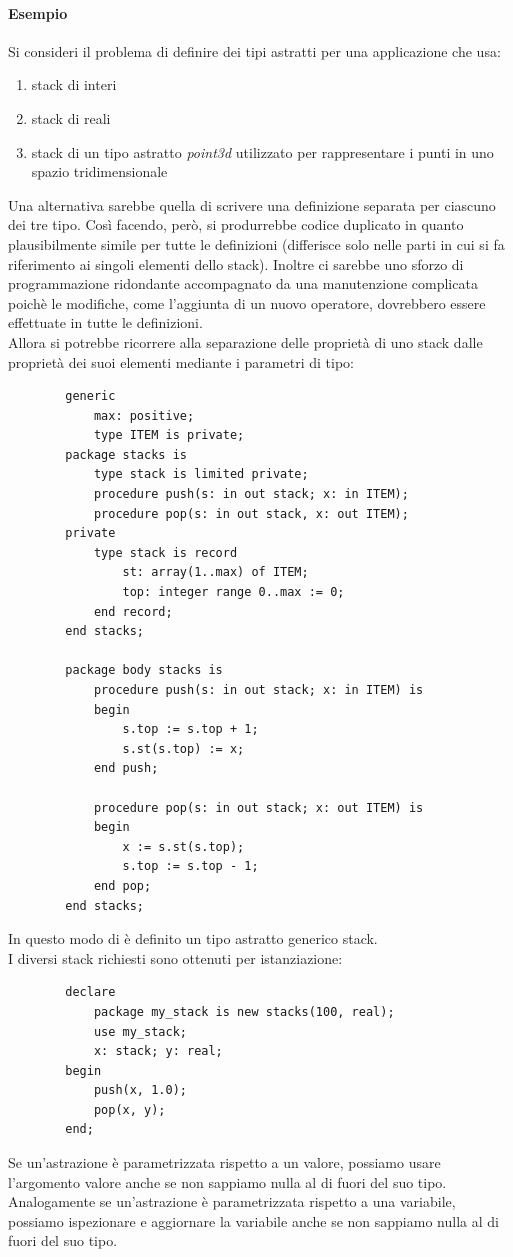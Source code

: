\documentclass{article}
\begin{document}
	\paragraph*{Esempio}
	Si consideri il problema di definire dei tipi astratti per una applicazione che usa:
	\begin{enumerate}
		\item stack di interi
		\item stack di reali
		\item stack di un tipo astratto \textit{point3d} utilizzato per rappresentare i punti in uno spazio tridimensionale
	\end{enumerate}
	Una alternativa sarebbe quella di scrivere una definizione separata per ciascuno dei tre tipo. Così facendo, però, si produrrebbe codice duplicato in quanto plausibilmente simile per tutte le definizioni (differisce solo nelle parti in cui si fa riferimento ai singoli elementi dello stack). Inoltre ci sarebbe uno sforzo di programmazione ridondante accompagnato da una manutenzione complicata poichè le modifiche, come l'aggiunta di un nuovo operatore, dovrebbero essere effettuate in tutte le definizioni. \\
	Allora si potrebbe ricorrere alla separazione delle proprietà di uno stack dalle proprietà dei suoi elementi mediante i parametri di tipo:
	\begin{verbatim}
		generic
			max: positive;
			type ITEM is private;
		package stacks is
			type stack is limited private;
			procedure push(s: in out stack; x: in ITEM);
			procedure pop(s: in out stack, x: out ITEM);
		private
			type stack is record
				st: array(1..max) of ITEM;
				top: integer range 0..max := 0;
			end record;
		end stacks;

		package body stacks is
			procedure push(s: in out stack; x: in ITEM) is
			begin
				s.top := s.top + 1;
				s.st(s.top) := x;
			end push;

			procedure pop(s: in out stack; x: out ITEM) is
			begin
				x := s.st(s.top);
				s.top := s.top - 1;
			end pop;
		end stacks;
	\end{verbatim}
	In questo modo di è definito un tipo astratto generico stack. \\
	I diversi stack richiesti sono ottenuti per istanziazione:
	\begin{verbatim}
		declare
			package my_stack is new stacks(100, real);
			use my_stack;
			x: stack; y: real;
		begin
			push(x, 1.0);
			pop(x, y);
		end;
	\end{verbatim}
	Se un'astrazione è parametrizzata rispetto a un valore, possiamo usare l'argomento valore anche se non sappiamo nulla al di fuori del suo tipo. Analogamente se un'astrazione è parametrizzata rispetto a una variabile, possiamo ispezionare e aggiornare la variabile anche se non sappiamo nulla al di fuori del suo tipo. \\
\end{document}
